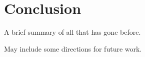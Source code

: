\chapter{Conclusion}

A brief summary of all that has gone before.

May include some directions for future work.